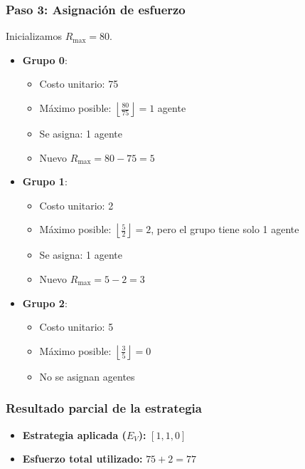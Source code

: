 \documentclass[11pt,letter]{article}
\begin{document}
\subsubsection*{Paso 3: Asignación de esfuerzo}

Inicializamos $R_{\text{max}} = 80$.

\begin{itemize}
    \item \textbf{Grupo 0}:
        \begin{itemize}
            \item Costo unitario: 75
            \item Máximo posible: $\left\lfloor \frac{80}{75} \right\rfloor = 1$ agente
            \item Se asigna: 1 agente
            \item Nuevo $R_{\text{max}} = 80 - 75 = 5$
        \end{itemize}

    \item \textbf{Grupo 1}:
        \begin{itemize}
            \item Costo unitario: 2
            \item Máximo posible: $\left\lfloor \frac{5}{2} \right\rfloor = 2$, pero el grupo tiene solo 1 agente
            \item Se asigna: 1 agente
            \item Nuevo $R_{\text{max}} = 5 - 2 = 3$
        \end{itemize}

    \item \textbf{Grupo 2}:
        \begin{itemize}
            \item Costo unitario: 5
            \item Máximo posible: $\left\lfloor \frac{3}{5} \right\rfloor = 0$
            \item No se asignan agentes
        \end{itemize}
\end{itemize}

\subsubsection*{Resultado parcial de la estrategia}

\begin{itemize}
    \item \textbf{Estrategia aplicada ($E_V$): } $[1, 1, 0]$
    \item \textbf{Esfuerzo total utilizado:} $75 + 2 = 77$
\end{itemize}
\end{document}
